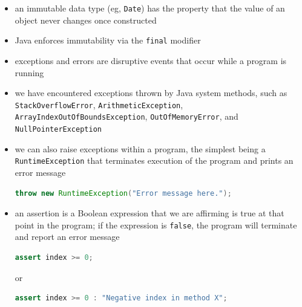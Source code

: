 \documentclass[8pt,a4paper,compress]{beamer}
\begin{document}
\begin{frame}[fragile]
\begin{itemize}
\item an immutable data type (eg, \lstinline{Date}) has the property that the value of an object never changes once constructed

\item Java enforces immutability via the \lstinline{final} modifier

\item exceptions and errors are disruptive events that occur while a program is running

\item we have encountered exceptions thrown by Java system methods, such as   \lstinline{StackOverflowError}, \lstinline{ArithmeticException}, \lstinline{ArrayIndexOutOfBoundsException}, \lstinline{OutOfMemoryError}, and \lstinline{NullPointerException}

\item we can also raise exceptions within a program, the simplest being a \lstinline{RuntimeException} that terminates execution of the program and prints an error message
\begin{lstlisting}[language=Java]
throw new RuntimeException("Error message here.");
\end{lstlisting}

\item an assertion is a Boolean expression that we are affirming is true at that point in the program; if the expression is \lstinline{false}, the program will terminate and report an error message
\begin{lstlisting}[language=Java]
assert index >= 0;
\end{lstlisting}
or
\begin{lstlisting}[language=Java]
assert index >= 0 : "Negative index in method X";
\end{lstlisting}
\end{itemize}
\end{frame}
\end{document}
